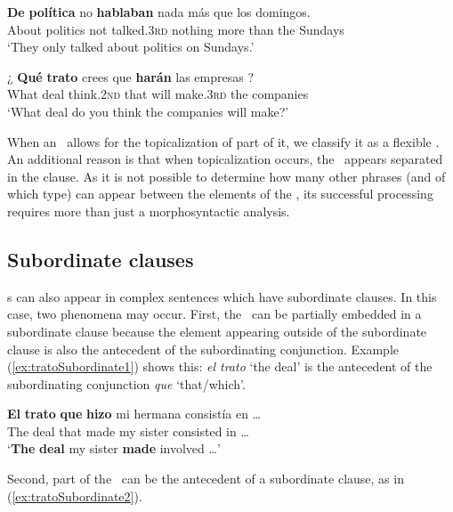 \documentclass[output=paper]{langsci/langscibook}
\begin{document}
\begin{exe}
\ex \label{ex:defutbolTopic}
\gll \textbf{De} \textbf{política} no \textbf{hablaban} nada más que los domingos. \\
About politics not {talked.\textsc{3rd}} nothing more than the Sundays \\
\glt `They only talked about politics on Sundays.'

\ex \label{ex:tratoTopic}
\gll ¿ \textbf{Qué} \textbf{trato} crees que \textbf{harán} las empresas ? \\
{} What deal {think.\textsc{2nd}} that {will make.\textsc{3rd}} the companies  \\
\glt `What deal do you think the companies will make?'
\end{exe}


When an \mwe\ allows for the topicalization of part of it, we classify it as a flexible \mwe.
An additional reason is that when topicalization occurs, the \mwe\ appears separated in the clause.
As it is not possible to determine how many other phrases (and of which type) can appear between the elements of the \mwe, its successful processing requires more than just a morphosyntactic analysis.

\subsection{Subordinate clauses}
\label{ssec:subordinateClauses}

\mwe s can also appear in complex sentences which have subordinate clauses.
In this case, two phenomena may occur.
First, the \mwe\ can be partially embedded in a subordinate clause because the element appearing outside of the subordinate clause is also the antecedent of the subordinating conjunction.
Example (\ref{ex:tratoSubordinate1}) shows this: \textit{el trato} `the deal' is the antecedent of the subordinating conjunction \textit{que} `that/which'.

\begin{exe}
\ex \label{ex:tratoSubordinate1}
\gll \textbf{El} \textbf{trato} \textbf{que} \textbf{hizo} mi hermana consistía en \ldots \\
The deal that made my sister consisted in \ldots\\
\glt `\textbf{The} \textbf{deal} my sister \textbf{made} involved \ldots'
\end{exe}

Second, part of the \mwe\ can be the antecedent of a subordinate clause, as in (\ref{ex:tratoSubordinate2}). 
\end{document}
